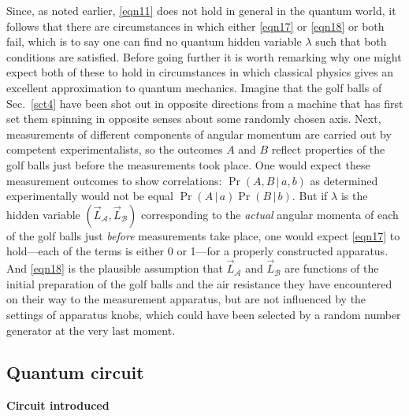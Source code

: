 \documentclass[12pt]{article} %
\def\outl#1{\par{\medskip\noindent\hspace*{.5cm}\bf
      \mathversion{bold}#1\mathversion{normal}\smallskip} }
\def\np{} \def\xa{} \def\xb{} \def\xn{} \def\xp{}
\def\outl#1{} \def\np{} \def\xa{} \def\xb{} \def\xn{} \def\xp{}
\def\outl#1{\par{\medskip\noindent\hspace*{.5cm}\bf
      \mathversion{bold}#1\mathversion{normal}\smallskip} }
\def\np{\newpage }\def\xn{\nopagebreak }\def\xp{\pagebreak }
\newcommand{\vb}{\,|\,}
\newcommand{\AM}{{\mathcal A}}
\newcommand{\BM}{{\mathcal B}}
\newcommand{\lm}{\lambda }
\begin{document}
Since, as noted earlier, \eqref{eqn11} does not hold in general in the quantum
world, it follows that there are circumstances in which either \eqref{eqn17}
or \eqref{eqn18} or both fail, which is to say one can find no quantum hidden
variable $\lm$ such that both conditions are satisfied.  Before going
further it is worth remarking why one might expect both of these to hold in
circumstances in which classical physics gives an excellent approximation to
quantum mechanics.
%
Imagine that the golf balls of Sec.~\ref{sct4} have been shot out in opposite
directions from a machine that has first set them spinning in opposite
senses about some randomly chosen axis.  Next, measurements of different
components of angular momentum are carried out by competent experimentalists,
so the outcomes $A$ and $B$ reflect properties of the golf balls just before
the measurements took place.  One would expect these measurement outcomes to
show correlations: $\Pr(A,B\vb a,b)$ as determined experimentally would not be
equal $\Pr(A\vb a)\Pr(B\vb b)$.  But if $\lm$ is the hidden variable $(\vec
L_\AM,\vec L_\BM)$ corresponding to the \emph{actual} angular momenta of each
of the golf balls just \emph{before} measurements take place, one would expect
\eqref{eqn17} to hold---each of the terms is either 0 or 1---for a properly
constructed apparatus.  And \eqref{eqn18} is the plausible assumption that
$\vec L_\AM$ and $\vec L_\BM$ are functions of the initial preparation of the
golf balls and the air resistance they have encountered on their way to the
measurement apparatus, but are not influenced by the settings of apparatus
knobs, which could have been selected by a random number generator at the very
last moment.

\xb
\subsection{Quantum circuit}
\label{sct5b}
\xa

\xb
\outl{Circuit introduced}
\xa
\end{document}
